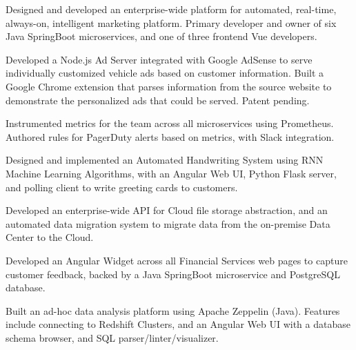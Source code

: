 \documentclass[letterpaper]{deedy-resume-openfont} %
\begin{document}
\begin{tightemize}
\item Designed and developed an enterprise-wide platform for automated, real-time, always-on, intelligent marketing platform. Primary developer and owner of six Java SpringBoot microservices, and one of three frontend Vue developers.
\item Developed a Node.js Ad Server integrated with Google AdSense to serve individually customized vehicle ads based on customer information. Built a Google Chrome extension that parses information from the source website to demonstrate the personalized ads that could be served. Patent pending.
\item Instrumented metrics for the team across all microservices using Prometheus. Authored rules for PagerDuty alerts based on metrics, with Slack integration.
\item Designed and implemented an Automated Handwriting System using RNN Machine Learning Algorithms, with an Angular Web UI, Python Flask server, and polling client to write greeting cards to customers.
\item Developed an enterprise-wide API for Cloud file storage abstraction, and an automated data migration system to migrate data from the on-premise Data Center to the Cloud.
\end{tightemize}

\sectionsep %


\begin{tightemize}
\item Developed an Angular Widget across all Financial Services web pages to capture customer feedback, backed by a Java SpringBoot microservice and PostgreSQL database.
\item Built an ad-hoc data analysis platform using Apache Zeppelin (Java). Features include connecting to Redshift Clusters, and an Angular Web UI with a database schema browser, and SQL parser/linter/visualizer.
\end{tightemize}

\sectionsep %

\end{document}
